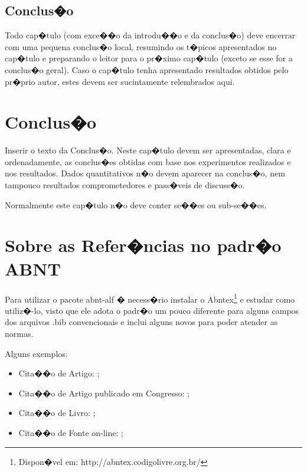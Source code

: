 \documentclass[msc, oneside]{ppgiathesis}
\begin{document}
\section{Conclus�o}

Todo cap�tulo (com exce��o da introdu��o e da conclus�o) deve
encerrar com uma pequena conclus�o local, resumindo os t�picos
apresentados no cap�tulo e preparando o leitor para o pr�ximo
cap�tulo (exceto se esse for a conclus�o geral). Caso o cap�tulo
tenha apresentado resultados obtidos pelo pr�prio autor, estes
devem ser sucintamente relembrados aqui.

\chapter{Conclus�o}

Inserir o texto da Conclus�o. Neste cap�tulo devem ser
apresentadas, clara e ordenadamente, as conclus�es obtidas com
base nos experimentos realizados e nos resultados. Dados
quantitativos n�o devem aparecer na conclus�o, nem tampouco
resultados comprometedores e pass�veis de discuss�o.

Normalmente este cap�tulo n�o deve conter se��es ou sub-se��es.

\chapter{Sobre as Refer�ncias no padr�o ABNT}

Para utilizar o pacote abnt-alf � necess�rio instalar o
Abntex\footnote{Dispon�vel em: http://abntex.codigolivre.org.br/}
e estudar como utiliz�-lo, visto que ele adota o padr�o um pouco
diferente para alguns campos dos arquivos .bib convencionais e
inclui alguns novos para poder atender as normas.

Alguns exemplos:

\begin{itemize}

\item Cita��o de Artigo: \cite{Pachet:2003};

\item Cita��o de Artigo publicado em Congresso:
\cite{Fingerhut:1999};

\item Cita��o de Livro: \cite{Kuncheva:2004};

\item Cita��o de Fonte on-line: \cite{Lyman:2003};

\end{itemize}
\end{document}
